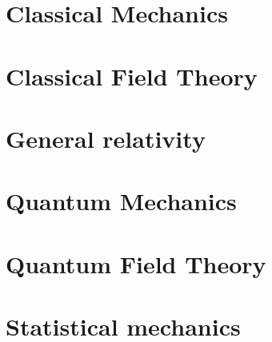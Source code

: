 \documentclass[cyan]{elegantnote}
\author{Yuyang Songsheng}
\begin{document}
\maketitle
\tableofcontents
\part{Classical Mechanics}

\part{Classical Field Theory}

\part{General relativity}

\part{Quantum Mechanics}


\part{Quantum Field Theory}




\part{Statistical mechanics}

\end{document}
